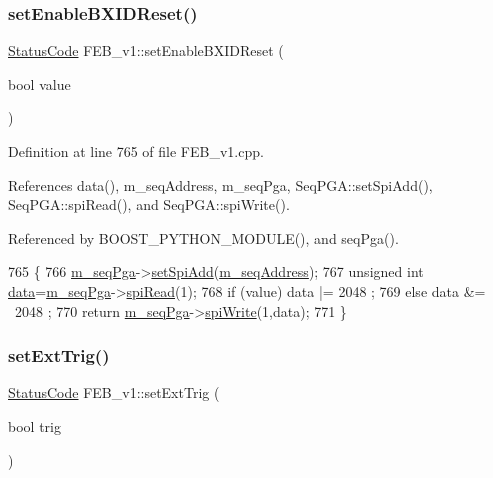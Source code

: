 \subsubsection{\texorpdfstring{set\+Enable\+B\+X\+I\+D\+Reset()}{setEnableBXIDReset()}}
{\footnotesize\ttfamily \hyperlink{classStatusCode}{Status\+Code} F\+E\+B\+\_\+v1\+::set\+Enable\+B\+X\+I\+D\+Reset (\begin{DoxyParamCaption}\item[{bool}]{value }\end{DoxyParamCaption})}



Definition at line 765 of file F\+E\+B\+\_\+v1.\+cpp.



References data(), m\+\_\+seq\+Address, m\+\_\+seq\+Pga, Seq\+P\+G\+A\+::set\+Spi\+Add(), Seq\+P\+G\+A\+::spi\+Read(), and Seq\+P\+G\+A\+::spi\+Write().



Referenced by B\+O\+O\+S\+T\+\_\+\+P\+Y\+T\+H\+O\+N\+\_\+\+M\+O\+D\+U\+L\+E(), and seq\+Pga().


\begin{DoxyCode}
765                                                  \{
766   \hyperlink{classFEB__v1_a6c7804ac86796f233a8393043adf2e77}{m\_seqPga}->\hyperlink{classSeqPGA_ac998ce3a6d9b5f2e88cc8393f8c1df53}{setSpiAdd}(\hyperlink{classFEB__v1_a1c1eb093fd1733b9510fcf8bc5c7ad08}{m\_seqAddress});
767   \textcolor{keywordtype}{unsigned} \textcolor{keywordtype}{int} \hyperlink{classFEB__v1_a6bca4320bd3bbbc32efc81097f33421a}{data}=\hyperlink{classFEB__v1_a6c7804ac86796f233a8393043adf2e77}{m\_seqPga}->\hyperlink{classSeqPGA_ab3d0e5e5d4014bc7a92588a76b8713d4}{spiRead}(1);
768   \textcolor{keywordflow}{if} (value) data |=  2048 ;
769   \textcolor{keywordflow}{else}       data &= ~2048 ;
770   \textcolor{keywordflow}{return} \hyperlink{classFEB__v1_a6c7804ac86796f233a8393043adf2e77}{m\_seqPga}->\hyperlink{classSeqPGA_ad4421841ce4ce8b88ad13f63216f0743}{spiWrite}(1,data);
771 \}
\end{DoxyCode}
\mbox{\label{classFEB__v1_aea3b1f84ea9be2e5c55a93ae215c8a35}} 
\subsubsection{\texorpdfstring{set\+Ext\+Trig()}{setExtTrig()}}
{\footnotesize\ttfamily \hyperlink{classStatusCode}{Status\+Code} F\+E\+B\+\_\+v1\+::set\+Ext\+Trig (\begin{DoxyParamCaption}\item[{bool}]{trig }\end{DoxyParamCaption})\hspace{0.3cm}{\ttfamily [inline]}}



